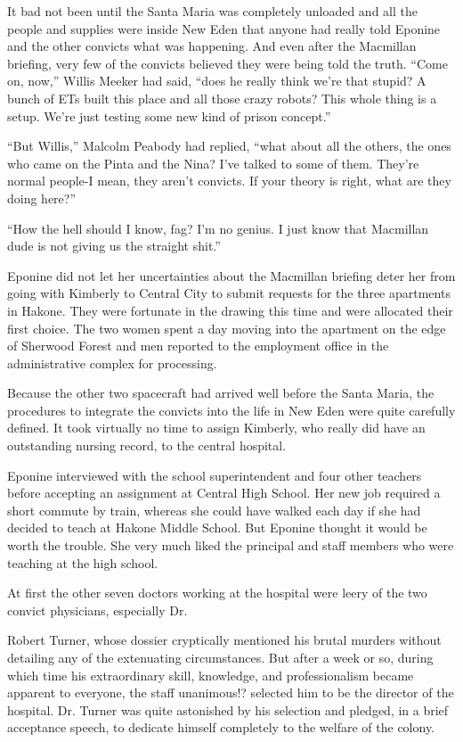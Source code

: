 \documentclass[]{article}
\begin{document}
{It bad not been until the Santa Maria was completely unloaded and all the people and supplies were inside New Eden that anyone had really told Eponine and the other convicts what was happening. And even after the Macmillan briefing, very few of the convicts believed they were being told the truth. “Come on, now,” Willis Meeker had said, “does he really think we’re that stupid? A bunch of ETs built this place and all those crazy robots? This whole thing is a setup. We’re just testing some new kind of prison concept.”

“But Willis,” Malcolm Peabody had replied, “what about all the others, the ones who came on the Pinta and the Nina? I’ve talked to some of them. They’re normal people-I mean, they aren’t convicts. If your theory is right, what are they doing here?”

“How the hell should I know, fag? I’m no genius. I just know that Macmillan dude is not giving us the straight shit.”

Eponine did not let her uncertainties about the Macmillan briefing deter her from going with Kimberly to Central City to submit requests for the three apartments in Hakone. They were fortunate in the drawing this time and were allocated their first choice. The two women spent a day moving into the apartment on the edge of Sherwood Forest and men reported to the employment office in the administrative complex for processing.

Because the other two spacecraft had arrived well before the Santa Maria, the procedures to integrate the convicts into the life in New Eden were quite carefully defined. It took virtually no time to assign Kimberly, who really did have an outstanding nursing record, to the central hospital.

Eponine interviewed with the school superintendent and four other teachers before accepting an assignment at Central High School. Her new job required a short commute by train, whereas she could have walked each day if she had decided to teach at Hakone Middle School. But Eponine thought it would be worth the trouble. She very much liked the principal and staff members who were teaching at the high school.

At first the other seven doctors working at the hospital were leery of the two convict physicians, especially Dr.

Robert Turner, whose dossier cryptically mentioned his brutal murders without detailing any of the extenuating circumstances. But after a week or so, during which time his extraordinary skill, knowledge, and professionalism became apparent to everyone, the staff unanimous!? selected him to be the director of the hospital. Dr. Turner was quite astonished by his selection and pledged, in a brief acceptance speech, to dedicate himself completely to the welfare of the colony.

}
\end{document}
